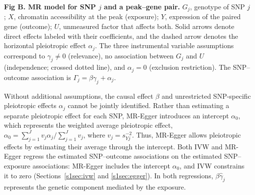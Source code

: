 \begin{center}
\vspace{6pt}

\begin{minipage}{0.85\linewidth}
\small\textbf{Fig B. MR model for SNP $j$ and a peak--gene pair.} $G_j$, genotype of SNP $j$; $X$, chromatin accessibility at the peak (exposure); $Y$, expression of the paired gene (outcome); $U$, unmeasured factor that affects both. Solid arrows denote direct effects labeled with their coefficients, and the dashed arrow denotes the horizontal pleiotropic effect $\alpha_j$. The three instrumental variable assumptions correspond to $\gamma_j\neq0$ (relevance), no association between $G_j$ and $U$ (independence; crossed dotted line), and $\alpha_j=0$ (exclusion restriction). The SNP--outcome association is $\Gamma_j=\beta\gamma_j+\alpha_j$.
\end{minipage}
\vspace{6pt}
\end{center}

\noindent Without additional assumptions, the causal effect $\beta$ and unrestricted SNP-specific pleiotropic effects $\alpha_j$ cannot be jointly identified. Rather than estimating a separate pleiotropic effect for each SNP, MR-Egger introduces an intercept $\alpha_0$, which represents the weighted average pleiotropic effect, $\alpha_0=\sum_{j=1}^{J}v_j\alpha_j/\sum_{j=1}^{J}v_j$, where $v_j=s_{Yj}^{-2}$. Thus, MR-Egger allows pleiotropic effects by estimating their average through the intercept. Both IVW and MR-Egger regress the estimated SNP--outcome associations on the estimated SNP--exposure associations: MR-Egger includes the intercept $\alpha_0$, and IVW constrains it to zero (Sections~\ref{s1sec:ivw} and \ref{s1sec:egger}). In both regressions, $\beta\hat{\gamma}_j$ represents the genetic component mediated by the exposure.

